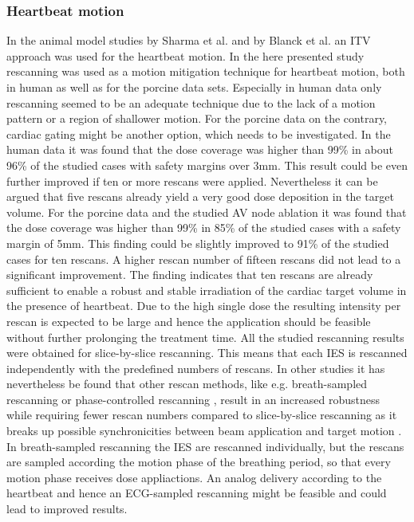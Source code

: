 \subsubsection{Heartbeat motion}
\label{diss:hb:mmt}

In the animal model studies by Sharma et al. \cite{Sha10} and by Blanck et al. \cite{Bla13} an ITV approach was used for the heartbeat motion. 
In the here presented study rescanning was used as a motion mitigation technique for heartbeat motion, both in human as well as for 
the porcine data sets. Especially in human data only rescanning seemed to be an adequate technique due to the lack of a motion pattern 
or a region of shallower motion. For the porcine data on the contrary, cardiac gating might be another option, which needs to be investigated. 
In the human data it was found that the dose coverage was higher than 99\% in about 96\% of the studied cases with safety margins over 3mm. 
This result could be even further improved if ten or more rescans were applied. Nevertheless it can be argued that five rescans already 
yield a very good dose deposition in the target volume. For the porcine data and the studied AV node ablation it was found 
that the dose coverage was higher than 99\% in 85\% of the studied cases with a safety margin of 5mm. This finding could be slightly improved to 
91\% of the studied cases for ten rescans. A higher rescan number of fifteen rescans did not lead to a significant improvement. 
The finding indicates that ten rescans are already sufficient to enable a robust and 
stable irradiation of the cardiac target volume in the presence of heartbeat. Due to the high single dose the resulting intensity per rescan 
is expected to be large and hence the application should be feasible without further prolonging the treatment time. 
All the studied rescanning results were obtained for slice-by-slice rescanning. This means that each IES is rescanned independently with the 
predefined numbers of rescans. In other studies it has nevertheless be found that other rescan methods, like e.g. breath-sampled rescanning 
\cite{Sec09} or phase-controlled rescanning \cite{Fur07}, result in an increased robustness while requiring fewer rescan numbers compared to 
slice-by-slice rescanning as it breaks up possible synchronicities between beam application and target motion \cite{Mue14}. In breath-sampled 
rescanning the IES are rescanned individually, but the rescans are sampled according the motion phase of the breathing period, so that every 
motion phase receives dose appliactions. An analog delivery according to the heartbeat and hence an ECG-sampled rescanning might be feasible 
and could lead to improved results. 

